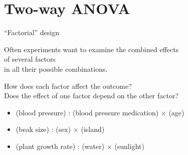 \section{Two-way ANOVA}


\begin{frame}{``Factorial'' design}

    Often experiments want to examine the combined effects \\
    of several \alert{factors} \\
    in all their possible combinations. \\

    \vspace{2em}

    How does each factor affect the outcome? \\
    Does the \alert{effect} of one factor depend on the other factor?

    \vspace{2em}


    \begin{itemize}
        \item (blood pressure) :  (blood pressure medication) $\times$ (age)
          \pause
        \item (beak size) : (sex) $\times$ (island)
          \pause
        \item (plant growth rate) : (water) $\times$ (sunlight)
    \end{itemize}


\end{frame}

